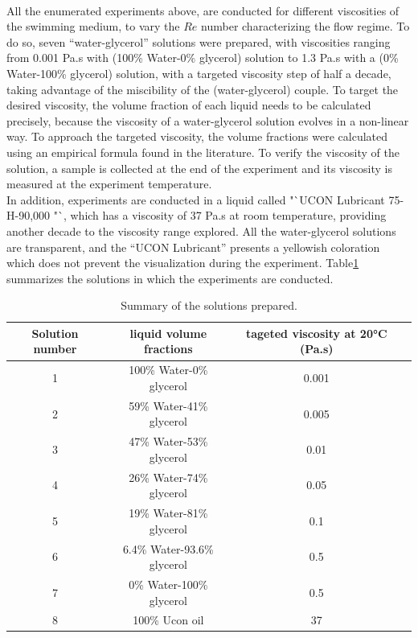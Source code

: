 \paragraph{}
All the enumerated experiments above, are conducted for different viscosities of the swimming medium, to vary the $Re$ number characterizing the flow regime. To do so, seven "`water-glycerol"' solutions were prepared, with viscosities ranging from 0.001 Pa.s with (100\% Water-0\% glycerol) solution  to 1.3 Pa.s with a (0\% Water-100\% glycerol) solution, with a targeted viscosity step of half a decade, taking advantage of the miscibility of the (water-glycerol) couple. To target the desired viscosity, the volume fraction of each liquid needs to be calculated precisely, because the viscosity of a water-glycerol solution evolves in a non-linear way\cite{viscositynonlinearCheng}. To approach the targeted viscosity, the volume fractions were calculated using an empirical formula found in the literature\cite{viscositynonlinearCheng}. To verify the viscosity of the solution, a sample is collected at the end of the experiment and its viscosity is measured at the experiment temperature.\\
In addition, experiments are conducted in a liquid called "`UCON Lubricant 75-H-90,000 "`, which has a viscosity of 37 Pa.s at room temperature, providing another decade to the viscosity range explored. All the water-glycerol solutions are transparent, and the "`UCON Lubricant"' presents a yellowish coloration which does not prevent the visualization during the experiment. 
Table\ref{tab:viscosities} summarizes the solutions in which the experiments are conducted.
\begin{table}[H]
	\centering
		\begin{adjustbox}{width=\textwidth}
			\begin{tabular}{|c|c|c|c|}
				\hline
				Solution number & liquid volume fractions & tageted viscosity at 20°C (Pa.s)\\
				\hline
				1&100\% Water-0\% glycerol&0.001\\
				2&59\% Water-41\% glycerol&0.005\\
				3&47\% Water-53\% glycerol&0.01\\
				4&26\% Water-74\% glycerol&0.05\\
				5&19\% Water-81\% glycerol&0.1\\
				6&6.4\% Water-93.6\% glycerol&0.5\\
				7&0\% Water-100\% glycerol&0.5\\
				8&100\% Ucon oil&37\\
				\hline
			\end{tabular}
		\end{adjustbox}
	\caption{Summary of the solutions prepared.}
	\label{tab:viscosities}
\end{table}
  
